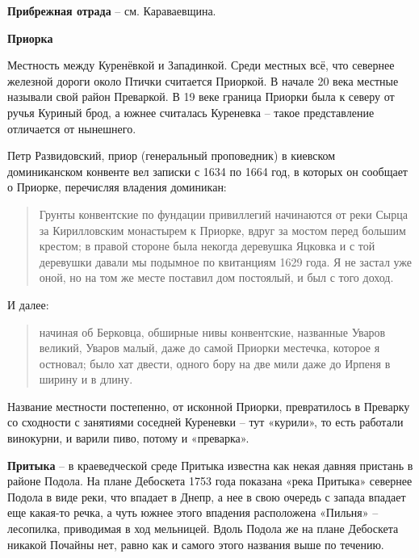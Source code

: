 \medskip

\textbf{Прибрежная отрада} – см. Караваевщина.\\


\medskip


\textbf{Приорка}

Местность между Куренёвкой и Западинкой. Среди местных всё, что севернее железной дороги около Птички считается Приоркой. В начале 20 века местные называли свой район Преваркой. В 19 веке граница Приорки была к северу от ручья Куриный брод, а южнее считалась Куреневка – такое представление отличается от нынешнего. 

Петр Развидовский, приор (генеральный проповедник) в киевском доминиканском конвенте вел записки с 1634 по 1664 год, в которых он сообщает о Приорке, перечисляя владения доминикан:

\begin{quotation}
Грунты конвентские по фундации привиллегий начинаются от реки Сырца за Кирилловским монастырем к Приорке, вдруг за мостом перед большим крестом; в правой стороне была некогда деревушка Яцковка и с той деревушки давали мы подымное по квитанциям 1629 года. Я не застал уже оной, но на том же месте поставил дом постоялый, и был с того доход.
\end{quotation}

И далее:

\begin{quotation}
начиная об Берковца, обширные нивы конвентские, названные Уваров великий, Уваров малый, даже до самой Приорки местечка, которое я остновал; было хат двести, одного бору на две мили даже до Ирпеня в ширину и в длину.
\end{quotation}

Название местности постепенно, от исконной Приорки, превратилось в Преварку со сходности с занятиями соседней Куреневки – тут «курили», то есть работали винокурни, и варили пиво, потому и «преварка».\\

\medskip

\textbf{Притыка} – в краеведческой среде Притыка известна как некая давняя пристань в районе Подола. На плане Дебоскета 1753 года показана «река Притыка» севернее Подола в виде реки, что впадает в Днепр, а нее в свою очередь с запада впадает еще какая-то речка, а чуть южнее этого впадения расположена «Пильня» – лесопилка, приводимая в ход мельницей. Вдоль Подола же на плане Дебоскета никакой Почайны нет, равно как и самого этого названия выше по течению.\\ 

